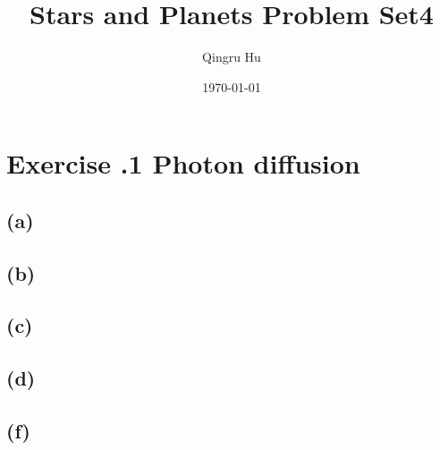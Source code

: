 \documentclass[a4paper,12pt]{article}
\title{\textbf{Stars and Planets Problem Set4}}
\author{Qingru Hu}
\date{\today}
\begin{document}
\maketitle
\section*{\textbf{Exercise \uppercase\expandafter{}.1 Photon diffusion}}
\subsection*{(a)}


\subsection*{(b)}


\subsection*{(c)}


\subsection*{(d)}


\subsection*{(f)}
\end{document}
